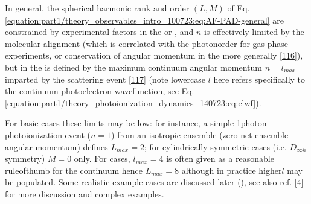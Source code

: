 \documentclass[letterpaper,table,10pt,english]{jupyterBook}
\begin{document}
\sphinxAtStartPar
In general, the spherical harmonic rank and order \((L,M)\) of Eq. \eqref{equation:part1/theory_observables_intro_100723:eq:AF-PAD-general} are constrained by experimental factors in the {\hyperref[\detokenize{backmatter/glossary:term-LF}]{}} or {\hyperref[\detokenize{backmatter/glossary:term-AF}]{}}, and \(n\) is effectively limited by the molecular alignment (which is correlated with the photon\sphinxhyphen{}order for gas phase experiments, or conservation of angular momentum in the {\hyperref[\detokenize{backmatter/glossary:term-LF}]{}} more generally {[}\hyperlink{cite.backmatter/bibliography:id978}{116}{]}), but in the {\hyperref[\detokenize{backmatter/glossary:term-MF}]{}} is defined by the maximum continuum angular momentum \(n=l_{max}\) imparted by the scattering event {[}\hyperlink{cite.backmatter/bibliography:id581}{117}{]} (note lower\sphinxhyphen{}case \(l\) here refers specifically to the continuum photoelectron wavefunction, see Eq. \eqref{equation:part1/theory_photoionization_dynamics_140723:eq:elwf}).

\sphinxAtStartPar
For basic cases these limits may be low: for instance, a simple 1\sphinxhyphen{}photon photoionization event (\(n=1\)) from an isotropic ensemble (zero net ensemble angular momentum) defines \(L_{max}=2\); for cylindrically symmetric cases (i.e. \(D_{\infty h}\) symmetry) \(M=0\) only. For {\hyperref[\detokenize{backmatter/glossary:term-MF}]{}} cases, \(l_{max}=4\) is often given as a reasonable rule\sphinxhyphen{}of\sphinxhyphen{}thumb for the continuum \sphinxhyphen{} hence \(L_{max}=8\) \sphinxhyphen{} although in practice higher\sphinxhyphen{}\(l\) may be populated. Some realistic example cases are discussed later ({\hyperref[\detokenize{part2/extracting_matrix_elements_overview_270423:chpt-extracting-matrix-elements-overview}]{}}), see also ref. {[}\hyperlink{cite.backmatter/bibliography:id676}{4}{]} for more discussion and complex examples.
\end{document}
